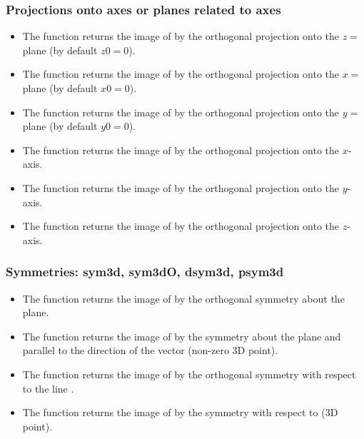 \subsubsection{Projections onto axes or planes related to axes}

\begin{itemize}
\item The function  returns the image of  by the orthogonal projection onto the $z=$ plane (by default $z0=0$).
\item The function  returns the image of  by the orthogonal projection onto the $x=$ plane (by default $x0=0$).
\item The function  returns the image of  by the orthogonal projection onto the $y=$ plane (by default $y0=0$).
\item The function  returns the image of  by the orthogonal projection onto the $x$-axis.
\item The function  returns the image of  by the orthogonal projection onto the $y$-axis.
\item The function  returns the image of  by the orthogonal projection onto the $z$-axis.
\end{itemize}

\subsubsection{Symmetries: sym3d, sym3dO, dsym3d, psym3d}

\begin{itemize}
\item The function  returns the image of  by the orthogonal symmetry about the  plane.
\item The function  returns the image of  by the symmetry about the  plane and parallel to the direction of the  vector (non-zero 3D point).
\item The function  returns the image of  by the orthogonal symmetry with respect to the line .
\item The function  returns the image of  by the symmetry with respect to  (3D point).
\end{itemize}

